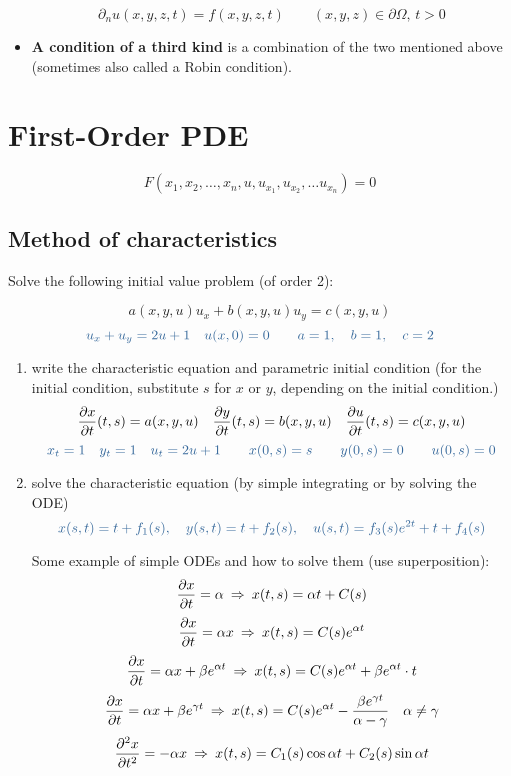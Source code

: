 \documentclass{article}
\begin{document}
\begin{twocolumn}
\begin{itemize}
	$$\partial_n u(x,y,z,t) = f(x,y,z,t) \qquad (x,y,z) \in \partial \Omega, \, t > 0$$
	
	\item \textbf{A condition of a third kind} is a combination of the two mentioned above (sometimes also called a Robin condition).
	
\end{itemize}

\section{First-Order PDE}

$$F(x_1,x_2,\ldots, x_n, u, u_{x_1}, u_{x_2}, \ldots u_{x_n}) = 0$$

\subsection{Method of characteristics}
Solve the following initial value problem (of order 2):

$$a(x,y,u) u_x + b(x,y,u) u_y = c(x,y,u)$$
$$\ex{u_x + u_y = 2u + 1 \quad u(x,0) = 0 \qquad a = 1, \quad b = 1, \quad c = 2}$$

\begin{enumerate}

\item write the characteristic equation and parametric initial condition (for the initial condition, substitute $s$ for $x$ or $y$, depending on the initial condition.)
$$\frac{\partial x}{\partial t}(t,s) = a(x,y,u) \quad \frac{\partial y}{\partial t}(t,s) = b(x,y,u) \quad \frac{\partial u}{\partial t}(t,s) = c(x,y,u)$$
$$\ex{x_t = 1 \quad y_t = 1 \quad u_t = 2u + 1 \qquad x(0,s) = s \qquad y(0,s) = 0 \qquad u(0,s) = 0}$$

\item solve the characteristic equation (by simple integrating or by solving the ODE)
$$\ex{x(s,t) = t + f_1(s), \quad y(s,t) = t + f_2(s), \quad u(s,t) = f_3(s) e^{2t} + t + f_4(s)}$$

Some example of simple ODEs and how to solve them (use superposition):
$$\frac{\partial x}{\partial t} = \alpha \: \Rightarrow \: x(t,s) = \alpha t + C(s)$$
$$\frac{\partial x}{\partial t} = \alpha x \: \Rightarrow \: x(t,s) = C(s) e^{\alpha t}$$
$$\frac{\partial x}{\partial t} = \alpha x + \beta e^{\alpha t} \: \Rightarrow \: x(t,s) = C(s) e^{\alpha t} + \beta e^{\alpha t} \cdot t$$
$$\frac{\partial x}{\partial t} = \alpha x + \beta e^{\gamma t} \: \Rightarrow \: x(t,s) = C(s) e^{\alpha t} - \frac{\beta e^{\gamma t}}{\alpha - \gamma} \quad \alpha \neq \gamma$$
$$\frac{\partial^2 x}{\partial t ^2} = -\alpha x \: \Rightarrow \: x(t,s) = C_1(s) \cos \alpha t + C_2(s) \sin \alpha t$$


\end{enumerate}
\end{twocolumn}
\end{document}
